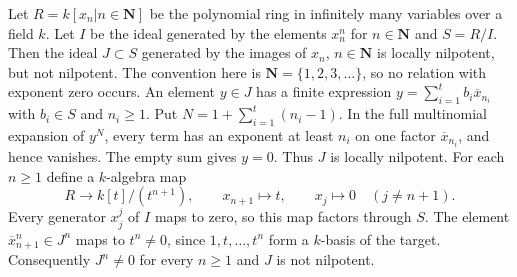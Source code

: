 \begin{example}
\label{editorial-source-example-locally-nilpotent-not-nilpotent}
Let $R = k[x_n | n \in \mathbf{N}]$ be the polynomial ring in infinitely
many variables over a field $k$. Let $I$ be the ideal generated by
the elements $x_n^n$ for $n \in \mathbf{N}$ and $S = R/I$. Then the ideal
$J \subset S$ generated by the images of $x_n$, $n \in \mathbf{N}$
is locally nilpotent, but not nilpotent. The convention here is
$\mathbf N=\{1,2,3,\ldots\}$, so no relation with exponent zero occurs.
An element $y\in J$ has a finite expression
$y=\sum_{i=1}^t b_i\overline{x}_{n_i}$ with $b_i\in S$ and $n_i\geq1$.
Put $N=1+\sum_{i=1}^t(n_i-1)$. In the full multinomial expansion
of $y^N$, every term has an exponent at least $n_i$ on one factor
$\overline{x}_{n_i}$, and hence vanishes. The empty sum gives $y=0$.
Thus $J$ is locally nilpotent.
For each $n\geq1$ define a $k$-algebra map
$$
R\longrightarrow k[t]/(t^{n+1}),\qquad
x_{n+1}\longmapsto t,\qquad x_j\longmapsto0\quad(j\ne n+1).
$$
Every generator $x_j^j$ of $I$ maps to zero, so this map factors
through $S$. The element $\overline{x}_{n+1}^n\in J^n$ maps to
$t^n\ne0$, since $1,t,\ldots,t^n$ form a $k$-basis of the target.
Consequently $J^n\ne0$ for every $n\geq1$ and $J$ is not nilpotent.
\end{example}